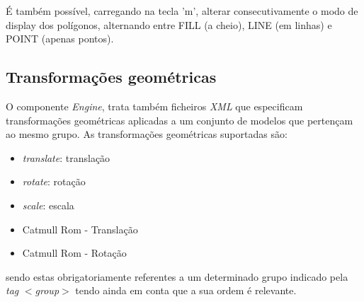 \documentclass{article}
\begin{document}
É também possível, carregando na tecla 'm', alterar consecutivamente o modo de display dos polígonos, alternando entre FILL (a cheio), LINE (em linhas) e POINT (apenas pontos).

\subsection{Transformações geométricas}
O componente \textit{Engine}, trata também ficheiros \textit{XML} que especificam transformações geométricas aplicadas a um conjunto de modelos que pertençam ao mesmo grupo. 
\newline
As transformações geométricas suportadas são:
\begin{itemize}
    \item \textit{translate}: translação 
    \item \textit{rotate}: rotação
    \item \textit{scale}: escala
    \item Catmull Rom - Translação
    \item Catmull Rom - Rotação
\end{itemize}
sendo estas obrigatoriamente referentes a um determinado grupo indicado pela \textit{tag} \textit{$<$group$>$} tendo ainda em conta que a sua ordem é relevante.
\end{document}
